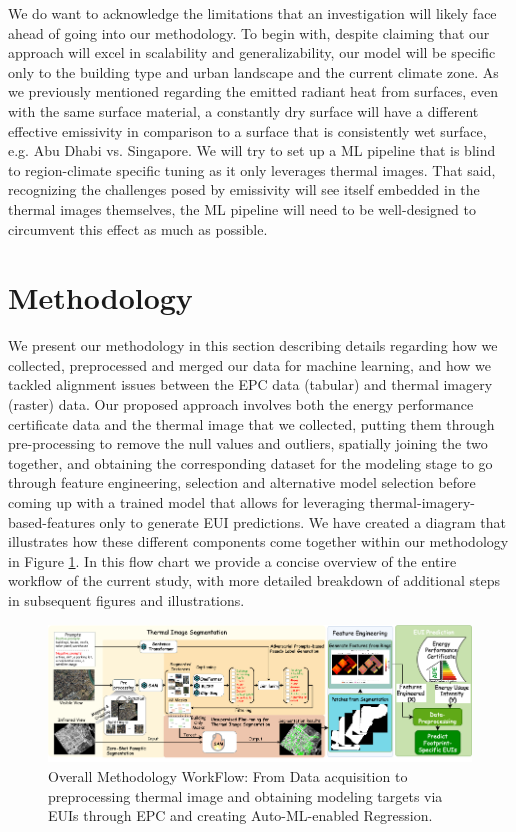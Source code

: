 \documentclass[preprint,12pt]{elsarticle}
\begin{document}
        We do want to acknowledge the limitations that an investigation will likely face ahead of going into our methodology. To begin with, despite claiming that our approach will excel in scalability and generalizability, our model will be specific only to the building type\cite{ahmad_building_2016} and urban landscape \cite{jain_forecasting_2014} and the current climate zone. As we previously mentioned regarding the emitted radiant heat from surfaces, even with the same surface material, a constantly dry surface will have a different effective emissivity in comparison to a surface that is consistently wet surface, e.g. Abu Dhabi vs. Singapore. We will try to set up a ML pipeline that is blind to region-climate specific tuning as it only leverages thermal images. That said, recognizing the challenges posed by emissivity will see itself embedded in the thermal images themselves, the ML pipeline will need to be well-designed to circumvent this effect as much as possible.
        
\section{Methodology}%
     We present our methodology in this section describing details regarding how we collected, preprocessed and merged our data for machine learning, and how we tackled alignment issues between the EPC data (tabular) and thermal imagery (raster) data. Our proposed approach involves both the energy performance certificate data and the thermal image that we collected, putting them through pre-processing to remove the null values and outliers, spatially joining the two together, and obtaining the corresponding dataset for the modeling stage to go through feature engineering, selection and alternative model selection before coming up with a trained model that allows for leveraging thermal-imagery-based-features only to generate EUI predictions. We have created a diagram that illustrates how these different components come together within our methodology in Figure \ref{fig:roadmap-diagram}. In this flow chart we provide a concise overview of the entire workflow of the current study, with more detailed breakdown of additional steps in subsequent figures and illustrations.
     
    \begin{figure}[h!]
        \centering
        \includegraphics[width=0.95\linewidth]{img/Segment.png}
        \caption{Overall Methodology WorkFlow: From Data acquisition to preprocessing thermal image and obtaining modeling targets via EUIs through EPC and creating Auto-ML-enabled Regression.}
        \label{fig:roadmap-diagram}
    \end{figure}
\end{document}

